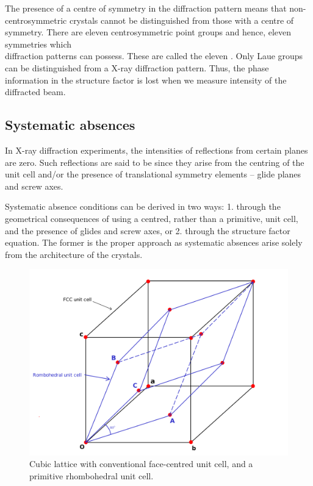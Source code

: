 	The presence of a centre of symmetry in the diffraction pattern means that non- centrosymmetric crystals cannot be distinguished from those with a centre of symmetry. There are eleven centrosymmetric point groups and hence, eleven symmetries which \\diffraction patterns can possess. These are called the eleven . Only Laue groups can be distinguished from a X-ray diffraction pattern. Thus, the phase information in the structure factor is lost when we measure intensity of the diffracted beam.


\subsection{Systematic absences}

	In X-ray diffraction experiments, the intensities of reflections from certain planes are zero. Such reflections are said to be  since they arise from the centring of the unit cell and/or the presence of translational symmetry elements -- glide planes and screw axes.
	
	Systematic absence conditions can be derived in two ways: 1. through the geometrical consequences of using a centred, rather than a primitive, unit cell, and the presence of glides and screw axes, or 2. through the structure factor equation. The former is the proper approach as systematic absences arise solely from the architecture of the crystals.
	
	\begin{figure}
	\centering
	\includegraphics[scale=0.12]{fcc_lattice.png}
	\caption{\label{fig:fcc_fr}Cubic lattice with conventional face-centred unit cell, and a primitive rhombohedral unit cell.}
	\end{figure}
	
